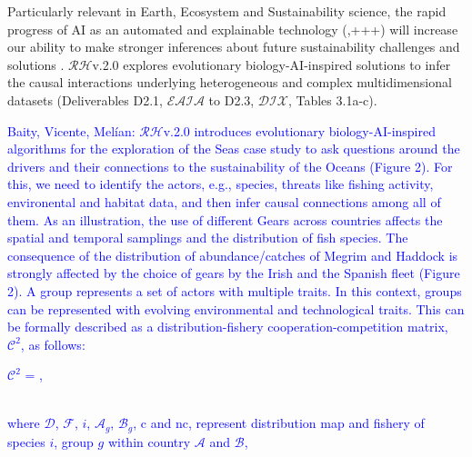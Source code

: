 \documentclass[11pt, a4paper]{article} %
\begin{document}
Particularly relevant in Earth, Ecosystem and Sustainability science,
the rapid progress of AI as an automated and explainable technology
(\citep{OHare2015,Gil2019,Cranmer2019,Guimera2020,Real2020,Futia2020},+++)
will increase our ability to make stronger inferences about future
sustainability challenges and solutions
\citep{Reichstein}. $\mathcal{RH}$v.2.0 explores evolutionary
biology-AI-inspired solutions to infer the causal interactions
underlying heterogeneous and complex multidimensional datasets
(Deliverables D2.1, $\mathcal{EAIA}$ to D2.3, $\mathcal{DIX}$, Tables
3.1a-c). \textcolor{blue}{Baity, Vicente, Mel\'ian:
  $\mathcal{RH}$v.2.0 introduces evolutionary biology-AI-inspired
  algorithms for the exploration of the Seas case study to ask
  questions around the drivers and their connections to the
  sustainability of the Oceans (Figure 2). For this, we need to
  identify the actors, e.g., species, threats like fishing activity,
  environental and habitat data, and then infer causal connections
  among all of them. As an illustration, the use of different Gears
  across countries affects the spatial and temporal samplings and the
  distribution of fish species. The consequence of the distribution of
  abundance/catches of Megrim and Haddock is strongly affected by the
  choice of gears by the Irish and the Spanish fleet (Figure 2). A
  group represents a set of actors with multiple traits. In this
  context, groups can be represented with evolving environmental and
  technological traits. This can be formally described as a
  distribution-fishery cooperation-competition matrix,
  $\mathcal{C}^{2}$, as follows:
  \vspace{0.1 in}\\
\begin{center}
  $\mathcal{C}^2$ = , \vspace{0.2 in}
\end{center}
\\
where $\mathcal{D}$, $\mathcal{F}$, $i$, $\mathcal{A}_{g}$,
$\mathcal{B}_{g}$, c and nc, represent distribution map and fishery of
species $i$, group $g$ within country $\mathcal{A}$ and $\mathcal{B}$,
}
\end{document}
